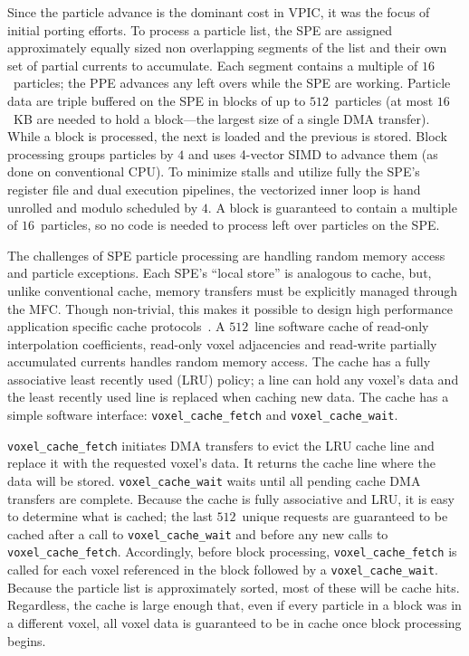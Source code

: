 \documentclass[journal,twoside]{IEEEtran}
\begin{document}
Since the particle advance is the dominant cost in VPIC, it was the
focus of initial porting efforts.  To process a particle list, the SPE
are assigned approximately equally sized non overlapping segments of
the list and their own set of partial currents to accumulate.  Each
segment contains a multiple of $16$~particles; the PPE advances any
left overs while the SPE are working.  Particle data are triple
buffered on the SPE in blocks of up to $512$~particles (at most
$16$~KB are needed to hold a block---the largest size of a single DMA
transfer).  While a block is processed, the next is loaded and the
previous is stored.  Block processing groups particles by $4$ and uses
4-vector SIMD to advance them (as done on conventional CPU).  To
minimize stalls and utilize fully the SPE's register file and dual
execution pipelines, the vectorized inner loop is hand unrolled and
modulo scheduled by $4$.  A block is guaranteed to contain a multiple
of $16$~particles, so no code is needed to process left over particles
on the SPE.

The challenges of SPE particle processing are handling random memory
access and particle exceptions.  Each SPE's ``local store'' is
analogous to cache, but, unlike conventional cache, memory transfers
must be explicitly managed through the MFC.  Though non-trivial, this
makes it possible to design high performance application specific
cache protocols~\cite{Kahle_et_al_2005}.  A $512$~line software cache
of read-only interpolation coefficients, read-only voxel adjacencies
and read-write partially accumulated currents handles random memory
access.  The cache has a fully associative least recently used (LRU)
policy; a line can hold any voxel's data and the least recently used
line is replaced when caching new data.  The cache has a simple
software interface: \verb+voxel_cache_fetch+ and
\verb+voxel_cache_wait+.

\verb+voxel_cache_fetch+ initiates DMA transfers to evict the LRU
cache line and replace it with the requested voxel's data.  It returns
the cache line where the data will be stored.  \verb+voxel_cache_wait+
waits until all pending cache DMA transfers are complete.  Because the
cache is fully associative and LRU, it is easy to determine what is
cached; the last $512$~unique requests are guaranteed to be cached
after a call to \verb+voxel_cache_wait+ and before any new calls to
\verb+voxel_cache_fetch+.  Accordingly, before block processing,
\verb+voxel_cache_fetch+ is called for each voxel referenced in the
block followed by a \verb+voxel_cache_wait+.  Because the particle
list is approximately sorted, most of these will be cache hits.
Regardless, the cache is large enough that, even if every particle in
a block was in a different voxel, all voxel data is guaranteed to be
in cache once block processing begins.
\end{document}
